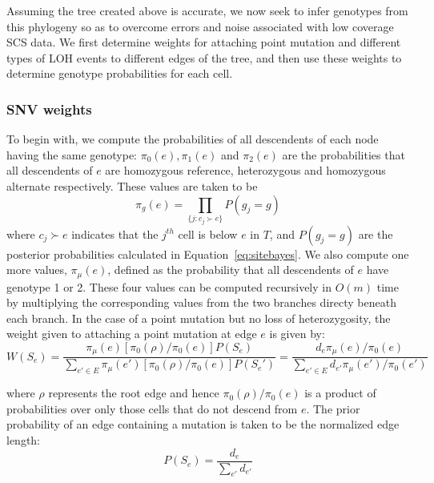 \documentclass[../../main.tex]{subfiles}
\begin{document}
Assuming the tree created above is accurate, we now seek to infer genotypes from this phylogeny so as to overcome errors and noise associated with low coverage SCS data. We first determine weights for attaching point mutation and different types of LOH events to different edges of the tree, and then use these weights to determine genotype probabilities for each cell.
\subsubsection{SNV weights}
To begin with, we compute the probabilities of all descendents of each node having the same genotype: $\pi_0(e), \pi_1(e)$ and $\pi_2(e)$ are the probabilities that all descendents of $e$ are homozygous reference, heterozygous and homozygous alternate respectively. These values are taken to be
\begin{equation*}
\pi_g(e) = \prod_{\{j:c_j\succ e\}} P(g_j = g)
\end{equation*}
where $c_j\succ e$ indicates that the $j^{th}$ cell is below $e$ in $T$, and $P(g_j =g)$ are the posterior probabilities calculated in Equation~\eqref{eq:sitebayes}. We also compute one more values, $\pi_\mu(e)$, defined as the probability that all descendents of $e$ have genotype 1 or 2. These four values can be computed recursively in $O(m)$ time by multiplying the corresponding values from the two branches directy beneath each branch. In the case of a point mutation but no loss of heterozygosity, the weight given to attaching a point mutation at edge $e$ is given by:
\begin{equation} \label{eq:edgemutpost}
W(S_e) = \frac{\pi_\mu(e)\left[\pi_0(\rho)/\pi_0(e)\right]P(S_e)}{\sum_{e'\in E}\pi_\mu(e')\left[\pi_0(\rho)/\pi_0(e)\right]P(S_e')} = \frac{d_e\pi_\mu(e)/\pi_0(e)}{\sum_{e'\in E} d_{e'}\pi_\mu(e')/\pi_0(e')}
\end{equation}

where $\rho$ represents the root edge and hence $\pi_0(\rho)/\pi_0(e)$ is a product of probabilities over only those cells that do not descend from $e$. The prior probability of an edge containing a mutation is taken to be the normalized edge length:
\begin{equation*}
P(S_e) = \frac{d_e}{\sum_{e'} d_{e'}}
\end{equation*}
\end{document}
